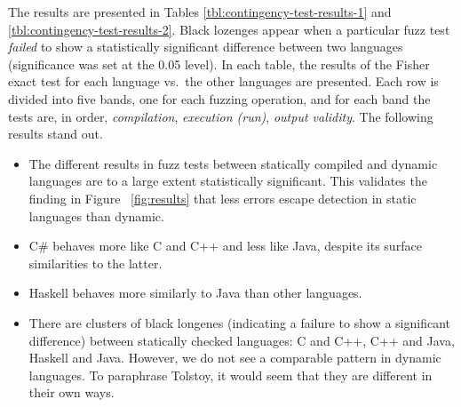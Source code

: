 \documentclass[10pt]{sigplanconf}
\begin{document}
The results are presented in Tables \ref{tbl:contingency-test-results-1} 
and \ref{tbl:contingency-test-results-2}. 
Black lozenges appear when a
particular fuzz test \emph{failed} to show a statistically significant
difference between two languages (significance was set at the 0.05
level). In each table, the results of the Fisher exact test for each
language vs.\ the other languages are presented.
Each row is divided into five bands, one for each fuzzing operation,
and for each band the tests are, in order, {\em compilation},
{\em execution (run)}, {\em output validity}.
The following results stand out.
\begin{itemize}
\item
The different results in fuzz tests between statically compiled and
dynamic languages are to a large extent statistically significant.
This validates the finding in Figure ~\ref{fig:results}
that less errors escape detection in static languages than dynamic.

\item C\# behaves more like C and C++ and less like Java, despite its
  surface similarities to the latter.

\item Haskell behaves more similarly to Java than other languages.

\item There are clusters of black longenes
(indicating a failure to show a significant difference)
between statically checked languages:
C and C++,
C++ and Java,
Haskell and Java.
However,
  we do not see a comparable pattern in dynamic languages.
  To paraphrase Tolstoy, it would seem that they are different in
  their own ways.
\end{itemize}
\end{document}
